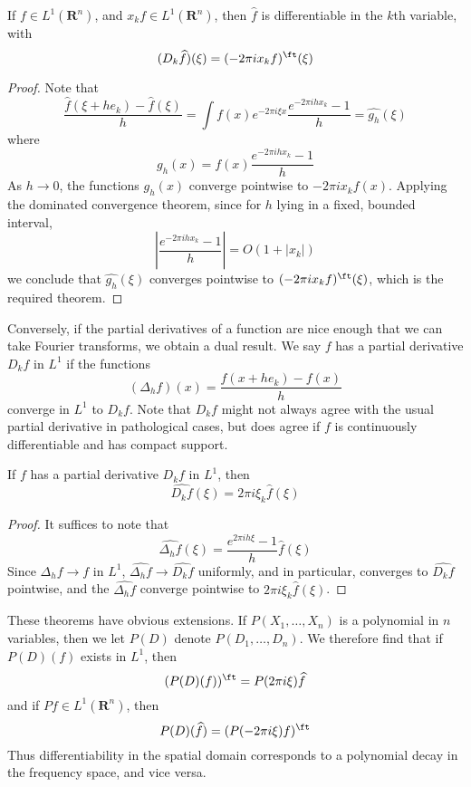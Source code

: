 \begin{theorem}
	If $f \in L^1(\mathbf{R}^n)$, and $x_k f \in L^1(\mathbf{R}^n)$, then $\widehat{f}$ is differentiable in the $k$th variable, with
	\[ (D_k \widehat{f})(\xi) = (- 2 \pi i x_k f)^\ft(\xi) \]
\end{theorem}
\begin{proof}
	Note that
	\[ \frac{\widehat{f}(\xi + h e_k) - \widehat{f}(\xi)}{h} = \int f(x) e^{- 2 \pi i \xi x} \frac{e^{-2 \pi i h x_k} - 1}{h} = \widehat{g_h}(\xi) \]
	where
	\[ g_h(x) = f(x) \frac{e^{- 2 \pi i h x_k} - 1}{h} \]
	As $h \to 0$, the functions $g_h(x)$ converge pointwise to $- 2 \pi i x_k f(x)$. Applying the dominated convergence theorem, since for $h$ lying in a fixed, bounded interval,
	\[ \left| \frac{e^{-2 \pi i h x_k} - 1}{h} \right| = O(1 + |x_k|) \]
	we conclude that $\widehat{g_h}(\xi)$ converges pointwise to $(-2 \pi i x_k f)^\ft(\xi)$, which is the required theorem.
\end{proof}

Conversely, if the partial derivatives of a function are nice enough that we can take Fourier transforms, we obtain a dual result. We say $f$ has a partial derivative $D_k f$ in $L^1$ if the functions
%
\[ (\Delta_h f)(x) = \frac{f(x + h e_k) - f(x)}{h} \]
%
converge in $L^1$ to $D_k f$. Note that $D_k f$ might not always agree with the usual partial derivative in pathological cases, but does agree if $f$ is continuously differentiable and has compact support.

\begin{theorem}
	If $f$ has a partial derivative $D_k f$ in $L^1$, then
	\[ \widehat{D_k f}(\xi) = 2 \pi i \xi_k \widehat{f}(\xi) \]
\end{theorem}
\begin{proof}
	It suffices to note that
	\[ \widehat{\Delta_h f}(\xi) = \frac{e^{2 \pi i h \xi} - 1}{h} \widehat{f}(\xi) \]
	Since $\Delta_h f \to f$ in $L^1$, $\widehat{\Delta_h f} \to \widehat{D_k f}$ uniformly, and in particular, converges to $\widehat{D_k f}$ pointwise, and the $\widehat{\Delta_h f}$ converge pointwise to $2 \pi i \xi_k \widehat{f}(\xi)$.
\end{proof}

These theorems have obvious extensions. If $P(X_1, \dots, X_n)$ is a polynomial in $n$ variables, then we let $P(D)$ denote $P(D_1, \dots, D_n)$. We therefore find that if $P(D)(f)$ exists in $L^1$, then
%
\[ (P(D)(f))^\ft = P(2 \pi i \xi) \widehat{f} \]
%
and if $Pf \in L^1(\mathbf{R}^n)$, then
%
\[ P(D)(\widehat{f}) = (P(-2 \pi i \xi) f)^\ft \]
%
Thus differentiability in the spatial domain corresponds to a polynomial decay in the frequency space, and vice versa.

